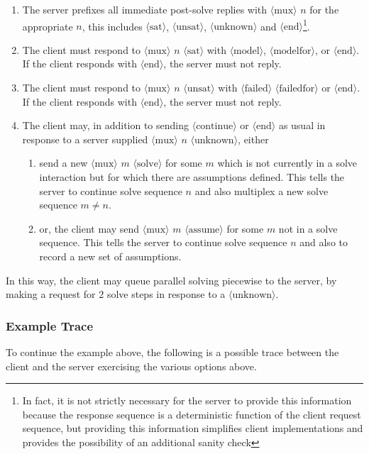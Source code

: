 \documentclass{article}
\newcommand\proto[1]{$\langle\mbox{#1}\rangle$}
\begin{document}
\begin{enumerate}
	\item The server prefixes all immediate post-solve replies with \proto{mux} $n$
		for the appropriate $n$, this includes \proto{sat}, \proto{unsat}, \proto{unknown} and 
		\proto{end}\footnote{In fact, it is not strictly necessary for the server to provide this
		information because the response sequence is a deterministic function of the client request
	sequence, but providing this information simplifies client implementations and provides 
  the possibility of an additional sanity check}.

  \item The client must respond to \proto{mux} $n$ \proto{sat} with \proto{model}, \proto{modelfor}, or
		\proto{end}.  If the client responds with \proto{end}, the server must not reply.

	\item The client must respond to \proto{mux} $n$ \proto{unsat} with \proto{failed} \proto{failedfor} or
		\proto{end}.  If the client responds with \proto{end}, the server must not reply.

	\item The client may, in addition to sending \proto{continue} or \proto{end}
		as usual in response to a server supplied \proto{mux} $n$ \proto{unknown}, either
		\begin{enumerate}
			\item send a new \proto{mux} $m$ \proto{solve}
		for some $m$ which is not currently in a solve interaction but for which there
		are assumptions defined.  This tells the server to continue solve sequence $n$ and also 
		multiplex a new solve sequence $m \neq n$. 
	\item or, the client may send \proto{mux} $m$ \proto{assume} for some $m$ not in
		a solve sequence.  This tells the server to continue solve sequence $n$ and also
		to record a new set of assumptions.
\end{enumerate}
\end{enumerate}

In this way, the client may queue parallel solving piecewise to the server, by making
a request for $2$ solve steps in response to a \proto{unknown}.

\subsubsection{Example Trace}
To continue the example above, the following is a possible trace between the
client and the server exercising the various options above.
\end{document}
